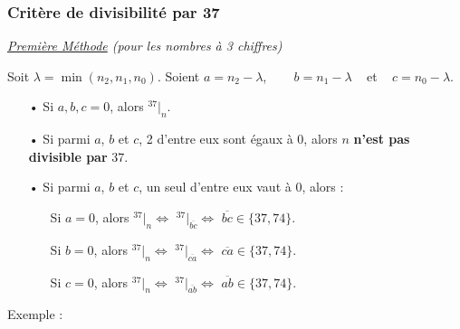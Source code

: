 \documentclass[a4paper]{article}
\begin{document}
\vfill
{\noindent \dotfill}

\subsubsection*{Critère de divisibilité par 37}

{\noindent  \textit{\underline{Première Méthode} (pour les nombres à 3 chiffres)}}

\vspace{0.2cm}

\par Soit $\lambda =\min(n_2, n_1, n_0)$. Soient $a = n_2 - \lambda$, ~~~ $b = n_1 - \lambda$ ~ et ~ $ c = n_0 - \lambda$.

\vspace{0.15cm}

\begin{itemize}
	\item[•] Si $a, b, c = 0$, alors {\Large $ ^{37}|_n $}.
	\vspace{0.1cm}
	\item[•] Si parmi $a$, $b$ et $c$, 2 d'entre eux sont égaux à $0$, alors $n$ \textbf{n'est pas divisible par} $37$.
	\vspace{0.1cm}
	\item[•] Si parmi $a$, $b$ et $c$, un seul d'entre eux vaut à $0$, alors : 
	\vspace{0.1cm}
	\begin{itemize}
		\item[] Si $a = 0$, alors {\Large $ ^{37}|_n \Leftrightarrow$ $^{37}|_{\overline{bc} } \Leftrightarrow$} $\overline{bc} \in \{37,74\}$.
		\item[] Si $b = 0$, alors {\Large $ ^{37}|_n \Leftrightarrow$ $^{37}|_{\overline{ca} } \Leftrightarrow$} $\overline{ca} \in \{37,74\}$.
		\item[] Si $c = 0$, alors {\Large $ ^{37}|_n \Leftrightarrow$ $^{37}|_{\overline{ab} } \Leftrightarrow$} $\overline{ab} \in \{37,74\}$.
		
	\end{itemize}
	
\end{itemize}
\vspace{0.1cm}

{ \parindent=0.5cm Exemple : }
\end{document}
